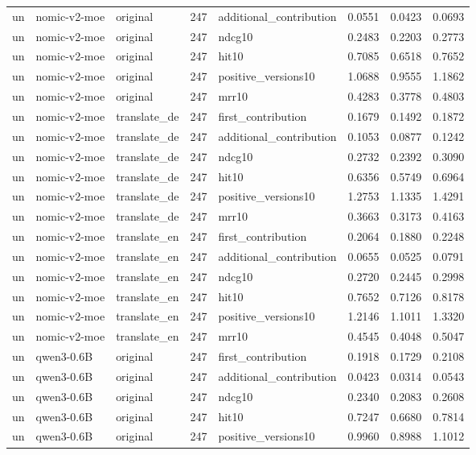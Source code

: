 \begin{tabular}{lllrlrrr}
un & nomic-v2-moe & original & 247 & additional\_contribution & 0.0551 & 0.0423 & 0.0693 \\
un & nomic-v2-moe & original & 247 & ndcg10 & 0.2483 & 0.2203 & 0.2773 \\
un & nomic-v2-moe & original & 247 & hit10 & 0.7085 & 0.6518 & 0.7652 \\
un & nomic-v2-moe & original & 247 & positive\_versions10 & 1.0688 & 0.9555 & 1.1862 \\
un & nomic-v2-moe & original & 247 & mrr10 & 0.4283 & 0.3778 & 0.4803 \\
un & nomic-v2-moe & translate\_de & 247 & first\_contribution & 0.1679 & 0.1492 & 0.1872 \\
un & nomic-v2-moe & translate\_de & 247 & additional\_contribution & 0.1053 & 0.0877 & 0.1242 \\
un & nomic-v2-moe & translate\_de & 247 & ndcg10 & 0.2732 & 0.2392 & 0.3090 \\
un & nomic-v2-moe & translate\_de & 247 & hit10 & 0.6356 & 0.5749 & 0.6964 \\
un & nomic-v2-moe & translate\_de & 247 & positive\_versions10 & 1.2753 & 1.1335 & 1.4291 \\
un & nomic-v2-moe & translate\_de & 247 & mrr10 & 0.3663 & 0.3173 & 0.4163 \\
un & nomic-v2-moe & translate\_en & 247 & first\_contribution & 0.2064 & 0.1880 & 0.2248 \\
un & nomic-v2-moe & translate\_en & 247 & additional\_contribution & 0.0655 & 0.0525 & 0.0791 \\
un & nomic-v2-moe & translate\_en & 247 & ndcg10 & 0.2720 & 0.2445 & 0.2998 \\
un & nomic-v2-moe & translate\_en & 247 & hit10 & 0.7652 & 0.7126 & 0.8178 \\
un & nomic-v2-moe & translate\_en & 247 & positive\_versions10 & 1.2146 & 1.1011 & 1.3320 \\
un & nomic-v2-moe & translate\_en & 247 & mrr10 & 0.4545 & 0.4048 & 0.5047 \\
un & qwen3-0.6B & original & 247 & first\_contribution & 0.1918 & 0.1729 & 0.2108 \\
un & qwen3-0.6B & original & 247 & additional\_contribution & 0.0423 & 0.0314 & 0.0543 \\
un & qwen3-0.6B & original & 247 & ndcg10 & 0.2340 & 0.2083 & 0.2608 \\
un & qwen3-0.6B & original & 247 & hit10 & 0.7247 & 0.6680 & 0.7814 \\
un & qwen3-0.6B & original & 247 & positive\_versions10 & 0.9960 & 0.8988 & 1.1012 \\

\end{tabular}
